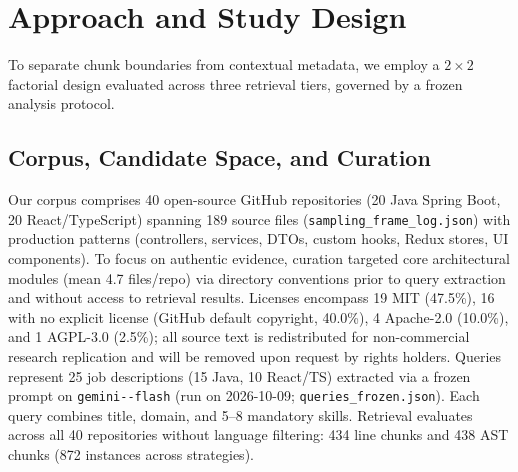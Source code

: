 \section{Approach and Study Design}
\label{sec:approach}

To separate chunk boundaries from contextual metadata, we employ a $2 \times 2$ factorial design evaluated across three retrieval tiers, governed by a frozen analysis protocol.

\subsection{Corpus, Candidate Space, and Curation}
\label{sec:approach:corpus}
Our corpus comprises 40 open-source GitHub repositories (20 Java Spring Boot, 20 React/TypeScript) spanning 189 source files (\texttt{sampling\_\allowbreak frame\_\allowbreak log.json}) with production patterns (controllers, services, DTOs, custom hooks, Redux stores, UI components). To focus on authentic evidence, curation targeted core architectural modules (mean 4.7 files/repo) via directory conventions prior to query extraction and without access to retrieval results. 
Licenses encompass 19 MIT (47.5\%), 16 with no explicit license (GitHub default copyright, 40.0\%), 4 Apache-2.0 (10.0\%), and 1 AGPL-3.0 (2.5\%); all source text is redistributed for non-commercial research replication and will be removed upon request by rights holders. 
Queries represent 25 job descriptions (15 Java, 10 React/TS) extracted via a frozen prompt on \texttt{gemini--flash} (run on 2026-10-09; \texttt{queries\_\allowbreak frozen.json}). Each query combines title, domain, and 5--8 mandatory skills. 
Retrieval evaluates across all 40 repositories without language filtering: 434 line chunks and 438 AST chunks (872 instances across strategies).

